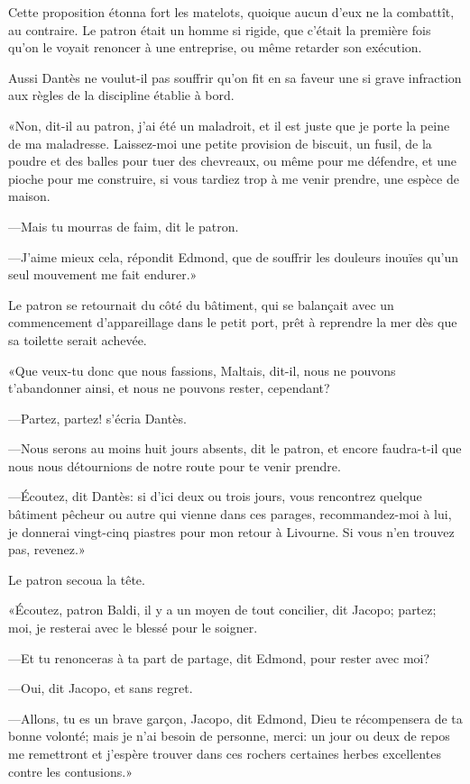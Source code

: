 Cette proposition étonna fort les matelots, quoique aucun d'eux ne la combattît, au contraire. Le patron était un homme si rigide, que c'était la première fois qu'on le voyait renoncer à une entreprise, ou même retarder son exécution.

Aussi Dantès ne voulut-il pas souffrir qu'on fit en sa faveur une si grave infraction aux règles de la discipline établie à bord.

«Non, dit-il au patron, j'ai été un maladroit, et il est juste que je porte la peine de ma maladresse. Laissez-moi une petite provision de biscuit, un fusil, de la poudre et des balles pour tuer des chevreaux, ou même pour me défendre, et une pioche pour me construire, si vous tardiez trop à me venir prendre, une espèce de maison.

—Mais tu mourras de faim, dit le patron.

—J'aime mieux cela, répondit Edmond, que de souffrir les douleurs inouïes qu'un seul mouvement me fait endurer.»

Le patron se retournait du côté du bâtiment, qui se balançait avec un commencement d'appareillage dans le petit port, prêt à reprendre la mer dès que sa toilette serait achevée.

«Que veux-tu donc que nous fassions, Maltais, dit-il, nous ne pouvons t'abandonner ainsi, et nous ne pouvons rester, cependant?

—Partez, partez! s'écria Dantès.

—Nous serons au moins huit jours absents, dit le patron, et encore faudra-t-il que nous nous détournions de notre route pour te venir prendre.

—Écoutez, dit Dantès: si d'ici deux ou trois jours, vous rencontrez quelque bâtiment pêcheur ou autre qui vienne dans ces parages, recommandez-moi à lui, je donnerai vingt-cinq piastres pour mon retour à Livourne. Si vous n'en trouvez pas, revenez.»

Le patron secoua la tête.

«Écoutez, patron Baldi, il y a un moyen de tout concilier, dit Jacopo; partez; moi, je resterai avec le blessé pour le soigner.

—Et tu renonceras à ta part de partage, dit Edmond, pour rester avec moi?

—Oui, dit Jacopo, et sans regret.

—Allons, tu es un brave garçon, Jacopo, dit Edmond, Dieu te récompensera de ta bonne volonté; mais je n'ai besoin de personne, merci: un jour ou deux de repos me remettront et j'espère trouver dans ces rochers certaines herbes excellentes contre les contusions.»

